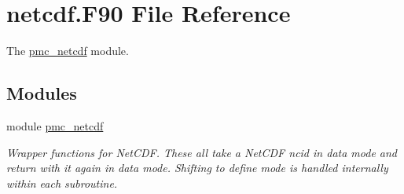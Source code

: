 \hypertarget{netcdf_8_f90}{}\section{netcdf.\+F90 File Reference}
\label{netcdf_8_f90}


The \mbox{\hyperlink{namespacepmc__netcdf}{pmc\+\_\+netcdf}} module.  


\subsection*{Modules}
\begin{DoxyCompactItemize}
\item 
module \mbox{\hyperlink{namespacepmc__netcdf}{pmc\+\_\+netcdf}}
\begin{DoxyCompactList}\small\item\em Wrapper functions for Net\+C\+DF. These all take a Net\+C\+DF {\ttfamily ncid} in data mode and return with it again in data mode. Shifting to define mode is handled internally within each subroutine. \end{DoxyCompactList}\end{DoxyCompactItemize}
